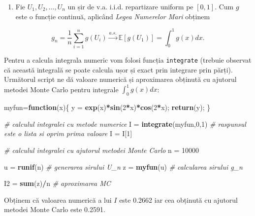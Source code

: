 \documentclass[]{article}
\newenvironment{Shaded}{\begin{snugshade}}{\end{snugshade}}
\newcommand{\KeywordTok}[1]{\textcolor[rgb]{0.13,0.29,0.53}{\textbf{#1}}}
\newcommand{\DecValTok}[1]{\textcolor[rgb]{0.00,0.00,0.81}{#1}}
\newcommand{\StringTok}[1]{\textcolor[rgb]{0.31,0.60,0.02}{#1}}
\newcommand{\CommentTok}[1]{\textcolor[rgb]{0.56,0.35,0.01}{\textit{#1}}}
\newcommand{\ControlFlowTok}[1]{\textcolor[rgb]{0.13,0.29,0.53}{\textbf{#1}}}
\newcommand{\OperatorTok}[1]{\textcolor[rgb]{0.81,0.36,0.00}{\textbf{#1}}}
\newcommand{\NormalTok}[1]{#1}
\providecommand{\tightlist}{%
  \setlength{\itemsep}{0pt}\setlength{\parskip}{0pt}}
\begin{document}
\begin{enumerate}
\def\labelenumi{\alph{enumi})}
\setcounter{enumi}{1}
\tightlist
\item
  Fie \(U_1,U_2,\dots,U_n\) un șir de v.a. i.i.d. repartizare uniform pe
  \([0,1]\). Cum \(g\) este o funcție continuă, aplicând \emph{Legea
  Numerelor Mari} obținem
\end{enumerate}

\[
  g_n=\frac{1}{n}\sum_{i=1}^{n}g(U_{i}) \overset{a.s.}{\to} \mathbb{E}[g(U_1)] = \int_{0}^{1}g(x)dx.
\]

Pentru a calcula integrala numeric vom folosi funcția \texttt{integrate}
(trebuie observat că această integrală se poate calcula ușor și exact
prin integrare prin părți). Următorul script ne dă valoare numerică și
aproximarea obținută cu ajutorul metodei Monte Carlo pentru integrale
\(\int_{0}^{1}g(x)dx\):

\begin{Shaded}
\begin{Highlighting}[]
\NormalTok{myfun=}\ControlFlowTok{function}\NormalTok{(x)\{}
\NormalTok{  y =}\StringTok{ }\KeywordTok{exp}\NormalTok{(x)}\OperatorTok{*}\KeywordTok{sin}\NormalTok{(}\DecValTok{2}\OperatorTok{*}\NormalTok{x)}\OperatorTok{*}\KeywordTok{cos}\NormalTok{(}\DecValTok{2}\OperatorTok{*}\NormalTok{x);}
  \KeywordTok{return}\NormalTok{(y);}
\NormalTok{\}}

\CommentTok{# calculul integralei cu metode numerice}
\NormalTok{I =}\StringTok{ }\KeywordTok{integrate}\NormalTok{(myfun,}\DecValTok{0}\NormalTok{,}\DecValTok{1}\NormalTok{) }\CommentTok{# raspunsul este o lista si oprim prima valoare}
\NormalTok{I =}\StringTok{ }\NormalTok{I[}\DecValTok{1}\NormalTok{]}

\CommentTok{# calculul integralei cu ajutorul metodei Monte Carlo}
\NormalTok{n =}\StringTok{ }\DecValTok{10000} 

\NormalTok{u =}\StringTok{ }\KeywordTok{runif}\NormalTok{(n) }\CommentTok{# generarea sirului U_n}
\NormalTok{z =}\StringTok{ }\KeywordTok{myfun}\NormalTok{(u) }\CommentTok{# calcularea sirului g_n}

\NormalTok{I2 =}\StringTok{ }\KeywordTok{sum}\NormalTok{(z)}\OperatorTok{/}\NormalTok{n }\CommentTok{# aproximarea MC}
\end{Highlighting}
\end{Shaded}

Obținem că valoarea numerică a lui \(I\) este 0.2662 iar cea obținută cu
ajutorul metodei Monte Carlo este 0.2591.
\end{document}
